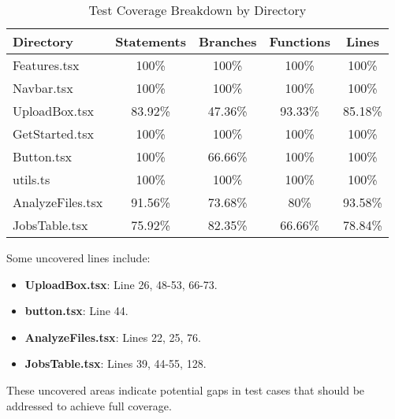 \documentclass[12pt, titlepage]{article}
\begin{document}
\begin{table}[h]
    \centering
    \begin{tabular}{|l|c|c|c|c|}
    \hline
    \textbf{Directory} & \textbf{Statements} & \textbf{Branches} & \textbf{Functions} & \textbf{Lines} \\
    \hline
    Features.tsx & 100\% & 100\% & 100\% & 100\% \\
    Navbar.tsx & 100\% & 100\% & 100\% & 100\% \\
    UploadBox.tsx & 83.92\% & 47.36\% & 93.33\% & 85.18\% \\
    GetStarted.tsx & 100\% & 100\% & 100\% & 100\% \\
    Button.tsx & 100\% & 66.66\% & 100\% & 100\% \\
    utils.ts & 100\% & 100\% & 100\% & 100\% \\
    AnalyzeFiles.tsx & 91.56\% & 73.68\% & 80\% & 93.58\% \\
    JobsTable.tsx & 75.92\% & 82.35\% & 66.66\% & 78.84\% \\
    \hline
    \end{tabular}
    \caption{Test Coverage Breakdown by Directory}
    \label{tab:coverage}
\end{table}

Some uncovered lines include:

\begin{itemize}
\item \textbf{UploadBox.tsx}: Line 26, 48-53, 66-73.
\item \textbf{button.tsx}: Line 44.
\item \textbf{AnalyzeFiles.tsx}: Lines 22, 25, 76.
\item \textbf{JobsTable.tsx}: Lines 39, 44-55, 128.
\end{itemize}

These uncovered areas indicate potential gaps in test cases that should be addressed to achieve full coverage.
\newpage

\end{document}
